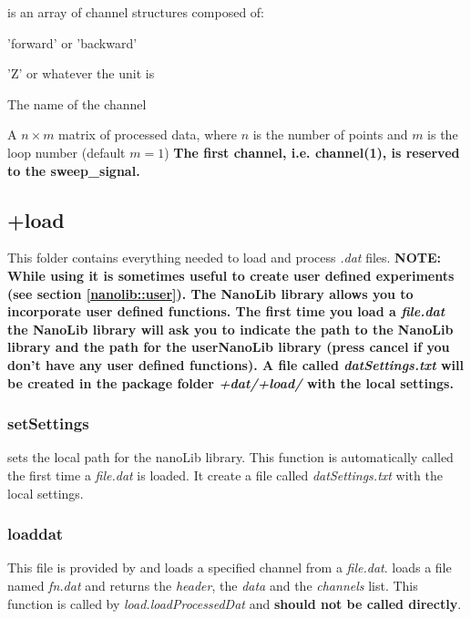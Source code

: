 \item[channels] is an array of channel structures composed of:
  \bdf
  \item[Direction] 'forward' or 'backward'
  \item[Unit] 'Z' or whatever the unit is
  \item[Name] The name of the channel
  \item[data] A $n\times m$ matrix of processed data, where $n$ is the number of points and $m$ is the loop number (default $m=1$)
  \edf
\edf
\textbf{The first channel, i.e. channel(1), is reserved to the sweep\_signal.}

\subsection{+load}
This folder contains everything needed to load and process \emph{.dat} files.
\textbf{NOTE: While using \nanonis{} it is sometimes useful to create user defined experiments (see section \ref{nanolib::user}). 
The NanoLib library allows you to incorporate user defined functions.
The first time you load a \emph{file.dat} the NanoLib library will ask you to indicate the path to the NanoLib library and the path for the userNanoLib library (press cancel if you don't have any user defined functions).
A file called \emph{datSettings.txt} will be created in the package folder \emph{+dat/+load/} with the local settings.}
\subsubsection{setSettings}
\bdf
{} sets the local path for the nanoLib library.
This function is automatically called the first time a \emph{file.dat} is loaded.
It create a file called \emph{datSettings.txt} with the local settings.
\edf

\subsubsection{loaddat}
This file is provided by \nanonis{} and loads a specified channel from a \emph{file.dat}.
\bdf
{} loads a file named \emph{fn.dat} and returns the \emph{header}, the \emph{data} and the \emph{channels} list.
 This function is called by \emph{load.loadProcessedDat} and \textbf{should not be called directly}.
\edf
